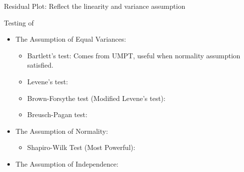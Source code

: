     Residual Plot: Reflect the linearity and variance assumption

    Testing of 
\begin{itemize}[topsep=2pt,itemsep=2pt]
    \item The Assumption of Equal Variances:
    \begin{itemize}[topsep=2pt,itemsep=2pt]
        \item Bartlett's test: Comes from UMPT, useful when normality assumption satisfied.
        \item Levene's test: 
        \item Brown-Forsythe test (Modified Levene's test): 
        \item Breusch-Pagan test:
    \end{itemize}


    \item The Assumption of Normality:
    \begin{itemize}[topsep=2pt,itemsep=2pt]
        \item Shapiro-Wilk Test (Most Powerful):
    \end{itemize}
    


    \item The Assumption of Independence:
        
    
        
\end{itemize}

    

    